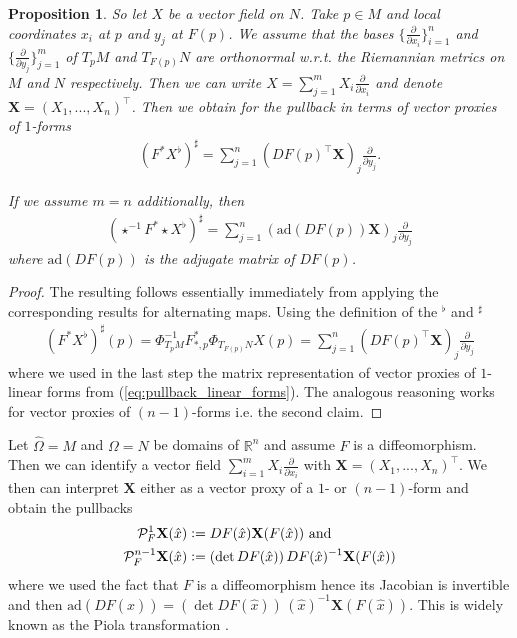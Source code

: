 \documentclass[12pt,a4paper]{article}
\numberwithin{equation}{subsection}
\numberwithin{lemma}{subsection}
\newtheorem{proposition}[lemma]{Proposition}
\theoremstyle{definition}
\newcommand{\real}{\mathbb{R}}
\begin{document}
\begin{proposition}
    So let $X$ be a vector field on $N$. Take $p \in M$ and local coordinates
    $x_i$ at $p$ and $y_j$ at $F(p)$. We assume that the bases
    $\{ \frac{\partial}{\partial x_i} \}_{i=1}^n$ and 
    $\{ \frac{\partial}{\partial y_j} \}_{j=1}^m$ of $T_p M$ and $T_{F(p)} N$ 
    are orthonormal w.r.t. the Riemannian metrics
    on $M$ and $N$ respectively. 
    Then we can write $X = \sum_{j=1}^m X_i \frac{\partial}{\partial x_i}$
    and denote $\mathbf{X} = (X_1,..., X_n)^\top$.
    Then we obtain for the pullback in terms of
    vector proxies of $1$-forms
    \begin{align*}
        (F^* X^\flat)^\sharp 
        = \sum_{j=1}^n (DF(p)^\top \mathbf{X})_j \frac{\partial}{\partial y_j}.
    \end{align*}

    If we assume $m=n$ additionally, then 
    \begin{align*}
        (\star^{-1} F^* \star X^\flat)^\sharp 
        = \sum_{j=1}^n (\text{ad}(DF(p)) \mathbf{X})_j \frac{\partial}{\partial y_j}
    \end{align*}
    where $\text{ad}(DF(p))$ is the adjugate matrix of $DF(p)$.
\end{proposition}
\begin{proof}
    The resulting follows essentially immediately from applying the 
    corresponding results for alternating maps. Using the definition of 
    the $^\flat$ and $^\sharp$
    \begin{align*}
        (F^* X^\flat)^\sharp(p)
        = \Phi^{-1}_{T_p M} F_{*,p}^* \Phi_{T_{F(p)}N} X(p)
        = \sum_{j=1}^n (DF(p)^\top \mathbf{X})_j \frac{\partial}{\partial y_j}
    \end{align*}
    where we used in the last step the matrix representation of vector proxies 
    of $1$-linear forms from (\ref{eq:pullback_linear_forms}). The analogous reasoning works 
    for vector proxies of $(n-1)$-forms i.e. the second claim.
\end{proof}

Let $\hat{\Omega} = M$ and $\Omega = N$ be domains of $\real^n$ and assume 
$F$ is a diffeomorphism. Then we 
can identify a vector field $\sum_{i=1}^m X_i \frac{\partial}{\partial x_i}$
with $\mathbf{X} = (X_1,...,X_n)^\top$. We then can interpret $\mathbf{X}$ 
either as a vector proxy of a $1$- or $(n-1)$-form and obtain the pullbacks
\begin{align*}
    \mathcal{P}^1_F \mathbf{X}(\hat{x}) &\vcentcolon= DF(\hat{x}) \mathbf{X}(F(\hat{x})) \text{ and}
    \\ \mathcal{P}^{n-1}_F \mathbf{X}(\hat{x}) &\vcentcolon= (\det DF(\hat{x}))\,
        DF(\hat{x})^{-1} \mathbf{X}(F(\hat{x}))
\end{align*}
where we used the fact that $F$ is a diffeomorphism hence its Jacobian 
is invertible and then $\text{ad}(DF(\hat{x})) = (\det DF(\hat{x}))\,
(\hat{x})^{-1} \mathbf{X}(F(\hat{x}))$.
This is widely known as the Piola transformation \cite[Def.\,9.8]{ern_guermond}.
\end{document}
